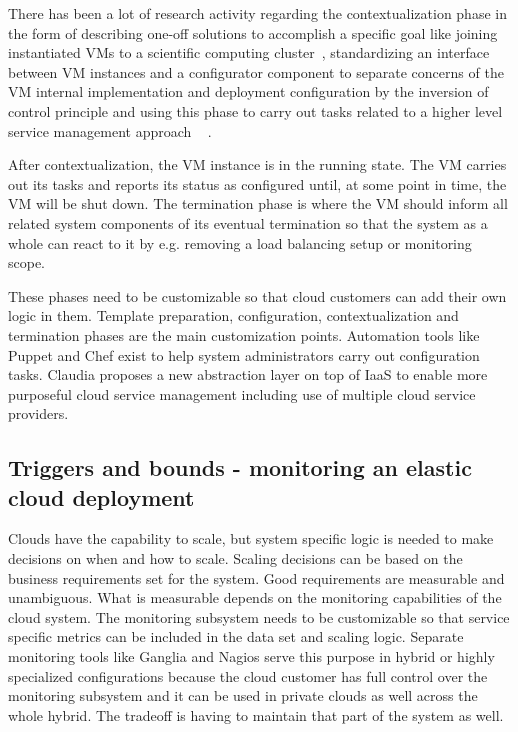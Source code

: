 \documentclass[english]{tktltiki2}
\theoremstyle{definition}
\theoremstyle{remark}
\begin{document}
There has been a lot of research activity regarding the contextualization phase
in the form of describing one-off solutions to accomplish a specific goal like
joining instantiated VMs to a scientific computing
cluster~\cite{Kijsiponge2010}, standardizing an interface between VM instances
and a configurator component to separate concerns of the VM internal
implementation and deployment configuration by the inversion of control
principle \cite{Liu2011} and using this phase to carry out tasks related to a
higher level service management approach ~\cite{frominfratoservice}
\cite{Kirschnick2010} \cite{Chapman2010}.

After contextualization, the VM instance is in the running state. The VM carries
out its tasks and reports its status as configured until, at some point in time,
the VM will be shut down. The termination phase is where the VM should inform
all related system components of its eventual termination so that the system as
a whole can react to it by e.g. removing a load balancing setup or monitoring
scope.

These phases need to be customizable so that cloud customers can add their own
logic in them. Template preparation, configuration, contextualization and
termination phases are the main customization points. Automation tools like
Puppet \cite{puppetlabswebsite} and Chef \cite{chefwebsite} exist to help system
administrators carry out configuration tasks. Claudia \cite{frominfratoservice}
proposes a new abstraction layer on top of IaaS to enable more purposeful cloud
service management including use of multiple cloud service providers.

\subsection{Triggers and bounds - monitoring an elastic cloud deployment}

Clouds have the capability to scale, but system specific logic is needed to make
decisions on when and how to scale. Scaling decisions can be based on the
business requirements set for the system. Good requirements are measurable and
unambiguous. What is measurable depends on the monitoring capabilities of the
cloud system. The monitoring subsystem needs to be customizable so that service
specific metrics can be included in the data set and scaling logic. Separate
monitoring tools like Ganglia \cite{gangliapaper} and Nagios \cite{nagios} serve
this purpose in hybrid or highly specialized configurations because the cloud
customer has full control over the monitoring subsystem and it can be used in
private clouds as well across the whole hybrid. The tradeoff is having to
maintain that part of the system as well.
\end{document}
